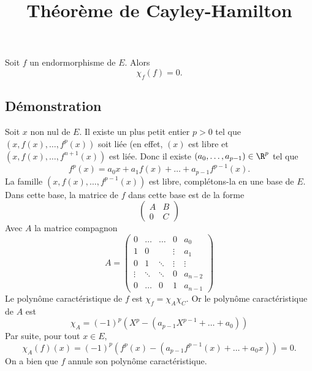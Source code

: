 \documentclass[fontsize=12pt,twoside=false,parskip=half, french]{scrartcl}
\title{Théorème de Cayley-Hamilton}
\date{}
\author{}
\begin{document}
\maketitle
   \begin{Theoreme}
      Soit $f$ un endormorphisme de $E$. Alors
      \[
         \chi_f(f) = 0.
      \]
   \end{Theoreme}
   \subsection{Démonstration}
      Soit $x$ non nul de $E$. Il existe un plus petit entier $p > 0$ tel que $(x, f(x), \ldots, f^p(x))$ soit liée
      (en effet, $(x)$ est libre et $(x, f(x), \ldots, f^{n + 1}(x))$ est liée. Donc il existe 
      $(a_0, \ldots, a_{p - 1}) \in \R^{p}$ tel que
      \[
         f^p(x) = a_0x + a_1 f(x) + \ldots + a_{p - 1}f^{p - 1}(x).
      \]
      La famille $(x, f(x), \ldots, f^{p - 1}(x))$ est libre, complétons-la en une base de $E$. Dans cette base, 
      la matrice de $f$ dans cette base est de la forme
      \[
         \begin{pmatrix}
            A & B\\
            0 & C
         \end{pmatrix}
      \]
      Avec $A$ la matrice compagnon
      \[
         A = 
         \begin{pmatrix}
            0      & \ldots & \ldots & 0      & a_0\\
            1      & 0      &        & \vdots & a_1\\
            0      & 1      & \ddots & \vdots & \vdots\\
            \vdots & \ddots & \ddots & 0      & a_{n - 2}\\
            0      & \ldots & 0      & 1      & a_{n - 1}
         \end{pmatrix}
      \]
      Le polynôme caractéristique de $f$ est $\chi_f = \chi_A\chi_C$. Or le polynôme caractéristique de $A$ est
      \[
         \chi_A = (-1)^p(X^p - (a_{p - 1}X^{p - 1} + \ldots + a_0))
      \]
      Par suite, pour tout $x \in E$,
      \[
         \chi_A(f)(x) = (-1)^p(f^p(x) - (a_{p - 1}f^{p - 1}(x) + \ldots + a_0x)) = 0.
      \]
      On a bien que $f$ annule son polynôme caractéristique.
\end{document}
